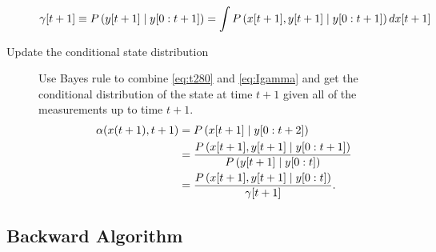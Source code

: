 \begin{description}
\begin{equation}
  \label{eq:Igamma}
  {\gamma}{[t+1]} \equiv P\left({y}{[t+1]}\mid y[0:t+1] \right) = \int
  P\left({x}{[t+1]},{y}{[t+1]}\mid y[0:t+1] \right) d{x}{[t+1]} \\
\end{equation}
\item[Update the conditional state distribution]  Use
  Bayes rule to combine \eqref{eq:t280} and \eqref{eq:Igamma} and get
  the conditional distribution of the state at time $t+1$ given all of
  the measurements up to time $t+1$.
\begin{align}
  \alpha(x(t+1),t+1) &= P\left({x}{[t+1]}\mid y[0:t+2] \right) \\
  &=  \frac{ P\left({x}{[t+1]},{y}{[t+1]}\mid y[0:t+1]
    \right)}{P\left({y}{[t+1]}\mid y[0:t] \right)}\\
  \label{eq:IUpdate}
  &= \frac{ P\left({x}{[t+1]},{y}{[t+1]}\mid y[0:t]
    \right)}{{\gamma}{[t+1]}}.
\end{align}
\end{description}

\subsection{Backward Algorithm}

